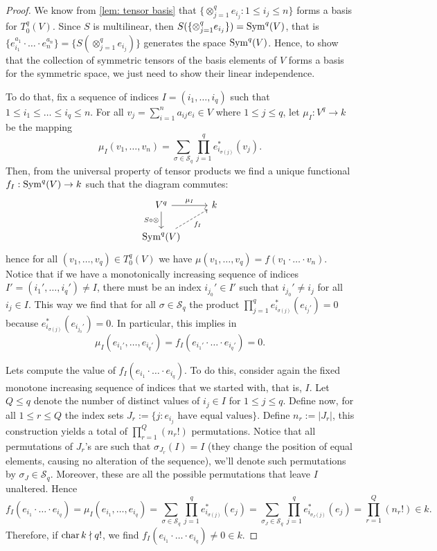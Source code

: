 \begin{proof}
  We know from \cref{lem: tensor basis} that \(\{\otimes_{j=1}^q e_{i_j}: 1 \leq
  i_j \leq n\}\) forms a basis for \(T_0^q(V)\). Since \(S\) is multilinear,
  then \(S(\{\otimes_{j=1}^q e_{i_j}\}) = \operatorname{Sym}^q(V)\), that is \(\{e_{i_1}^{a_1}
  \cdot \ldots \cdot e_n^{a_n}\} = \{S(\otimes_{j=1}^q e_{i_j})\}\) generates
  the space \(\operatorname{Sym}^q(V)\). Hence, to show that the collection of symmetric
  tensors of the basis elements of \(V\) forms a basis for the symmetric space,
  we just need to show their linear independence.

  To do that, fix a sequence of indices \(I = (i_1, \dots, i_q)\) such that  \(1
  \leq i_1 \leq \dots \leq i_q \leq n\). For all \(v_j = \sum_{i=1}^n a_{ij} e_i
  \in V\) where \(1 \leq j \leq q\), let \(\mu_I: V^q \to k\) be the mapping
  \[
    \mu_I(v_1, \dots, v_n) = \sum_{\sigma \in \mathcal S_q} \prod_{j=1}^q
    e_{i_{\sigma(j)}}^*(v_j).
  \]
  Then, from the universal property of tensor products we find a unique
  functional \(f_I: \operatorname{Sym}^q(V) \to k\) such that the diagram commutes:
  \[
    \begin{tikzcd}
      V^q \ar[r, "\mu_I"] \ar[d, swap, "S \circ \otimes"] &k \\
      \Sym^q(V) \ar[ru, swap, dashed, "f_I"]
    \end{tikzcd}
  \]
  hence for all \((v_1, \dots, v_q) \in T_0^q(V)\) we have \(\mu(v_1, \dots,
  v_q) = f(v_1 \cdot \ldots \cdot v_n)\). Notice that if we have a monotonically
  increasing sequence of indices \(I' = (i_1', \dots, i_q') \neq I\), there must
  be an index \(i_{j_0}' \in I'\) such that \(i_{j_0}' \neq i_j\) for all \(i_j
  \in I\). This way we find that for all \(\sigma \in \mathcal S_q\) the product
  \(\prod_{j=1}^q e_{i_{\sigma(j)}}^*(e_{i_j'}) = 0\) because
  \(e_{i_{\sigma(j)}}^*(e_{i_{j_0}'}) = 0\). In particular, this implies in
  \[
    \mu_I(e_{i_1'}, \dots, e_{i_q'}) = f_I(e_{i_1'} \cdot \ldots \cdot e_{i_q'})
    = 0.
  \]

  Lets compute the value of \(f_I(e_{i_1} \cdot \ldots \cdot e_{i_q})\). To do
  this, consider again the fixed monotone increasing sequence of indices that we
  started with, that is, \(I\). Let \(Q \leq q\) denote the number of distinct
  values of \(i_j \in I\) for \(1 \leq j \leq q\). Define now, for all \(1 \leq
  r \leq Q\) the index sets \(J_r := \{j : e_{i_j} \text{ have equal
  values}\}\). Define \(n_r := |J_r|\), this construction yields a total of
  \(\prod_{r=1}^Q (n_r!)\) permutations. Notice that all permutations of
  \(J_r\)'s are such that \(\sigma_{J_r}(I) = I\) (they change the position of
  equal elements, causing no alteration of the sequence), we'll denote such
  permutations by \(\sigma_J \in \mathcal S_q\). Moreover, these are
  all the possible permutations that leave \(I\) unaltered. Hence
  \[
    f_I(e_{i_1} \cdot \ldots \cdot e_{i_q}) = \mu_I(e_{i_1}, \dots, e_{i_q})
    = \sum_{\sigma \in \mathcal S_q} \prod_{j=1}^q e_{i_{\sigma(j)}}^*(e_j)
    = \sum_{\sigma_J \in \mathcal S_q} \prod_{j=1}^q e_{i_{\sigma_J(j)}}^*(e_j)
    = \prod_{r=1}^Q (n_r!) \in k.
  \]
  Therefore, if \(\operatorname{char} k \nmid q!\), we find \(f_I(e_{i_1} \cdot \ldots \cdot
  e_{i_q}) \neq 0 \in k\).


\end{proof}
